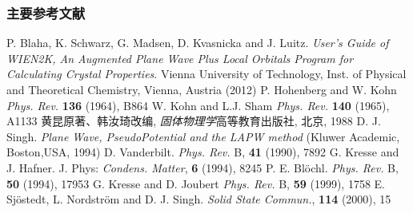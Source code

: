 \documentclass[cjk,slidestop,compress,mathserif,blue]{beamer}
\begin{document}
\appendix
\begin{thebibliography}{99}



\begin{thebibliography}{99}
\frame
{
\frametitle{主要参考文献}
{\small
{}\textrm{P. Blaha, K. Schwarz, G. Madsen, D. Kvasnicka and J. Luitz. \textit{User's Guide of WIEN2K, An Augmented Plane Wave Plus Local Orbitals Program for Calculating Crystal Properties}. Vienna University of Technology, Inst. of Physical and Theoretical Chemistry, Vienna, Austria (2012)}
\textrm{P. Hohenberg and W. Kohn \textit{Phys. Rev.} \textbf{136} (1964), B864}
\textrm{W. Kohn and L.J. Sham \textit{Phys. Rev.} \textbf{140} (1965), A1133}
黄昆\:原著、韩汝琦\:改编, \textit{固体物理学}\:高等教育出版社, 北京, 1988
\textrm{D. J. Singh. \textit{Plane Wave, PseudoPotential and the LAPW method} (Kluwer Academic, Boston,USA, 1994)}
\textrm{D. Vanderbilt. \textit{Phys. Rev.} B, \textbf{41} (1990), 7892} 
\textrm{G. Kresse and J. Hafner. J. Phys: \textit{Condens. Matter}, \textbf{6} (1994), 8245}
\textrm{P. E. Bl\"ochl. \textit{Phys. Rev.} B, \textbf{50} (1994), 17953}
\textrm{G. Kresse and D. Joubert \textit{Phys. Rev.} B, \textbf{59} (1999), 1758}
\textrm{E. Sj\"ostedt, L. Nordstr\"om and D. J. Singh. \textit{Solid State Commun.}, \textbf{114} (2000), 15}
\nocite*{}
}
}


\end{thebibliography}
\end{thebibliography}
\end{document}
